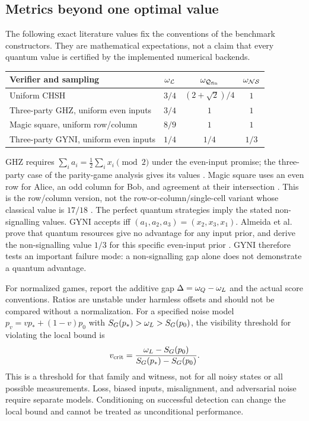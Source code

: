 \subsection{Metrics beyond one optimal value}
\label{sec:benchmarks}
The following exact literature values fix the conventions of the benchmark
constructors. They are mathematical expectations, not a claim that every
quantum value is certified by the implemented numerical backends.
\begin{center}
\begin{tabular}{lccc}
\toprule
Verifier and sampling & $\omega_{\mathcal L}$ & $\omega_{\mathcal Q_{\rm fin}}$ & $\omega_{\mathcal{NS}}$\\
\midrule
Uniform CHSH & $3/4$ & $(2+\sqrt2)/4$ & $1$\\
Three-party GHZ, uniform even inputs & $3/4$ & $1$ & $1$\\
Magic square, uniform row/column & $8/9$ & $1$ & $1$\\
Three-party GYNI, uniform even inputs & $1/4$ & $1/4$ & $1/3$\\
\bottomrule
\end{tabular}
\end{center}
GHZ requires $\sum_i a_i=\frac12\sum_i x_i\pmod2$ under the even-input
promise; the three-party case of the parity-game analysis gives its values
\cite{brassard2003}. Magic square uses an even row for Alice, an odd column
for Bob, and agreement at their intersection \cite[Sec.~5]{brassard2005}.
This is the row/column version, not the row-or-column/single-cell variant
whose classical value is $17/18$ \cite[Sec.~3.3]{cleve2004}.
The perfect quantum strategies imply the stated non-signalling values.
GYNI accepts iff $(a_1,a_2,a_3)=(x_2,x_3,x_1)$. Almeida et al. prove that
quantum resources give no advantage for any input prior, and derive the
non-signalling value $1/3$ for this specific even-input prior
\cite[Eqs.~(10)--(12)]{almeida2010}. GYNI therefore tests an important failure
mode: a non-signalling gap alone does not demonstrate a quantum advantage.

For normalized games, report the additive gap
$\Delta=\omega_Q-\omega_L$ and the actual score conventions. Ratios are unstable
under harmless offsets and should not be compared without a normalization.
For a specified noise model
$p_v=vp_*+(1-v)p_0$ with $S_G(p_*)>\omega_L>S_G(p_0)$, the visibility threshold
for violating the local bound is
\[
 v_{\rm crit}=\frac{\omega_L-S_G(p_0)}{S_G(p_*)-S_G(p_0)}.
\]
This is a threshold for that family and witness, not for all noisy states or
all possible measurements. Loss, biased inputs, misalignment, and adversarial
noise require separate models. Conditioning on successful detection can change
the local bound and cannot be treated as unconditional performance.


